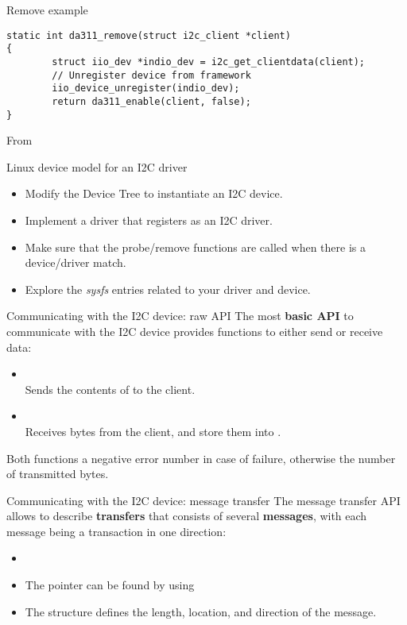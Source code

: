 \begin{frame}[fragile]{Remove example}
  \begin{block}{}
    \begin{verbatim}
static int da311_remove(struct i2c_client *client)
{
        struct iio_dev *indio_dev = i2c_get_clientdata(client);
        // Unregister device from framework
        iio_device_unregister(indio_dev);
        return da311_enable(client, false);
}
    \end{verbatim}
  \end{block}
  From 
\end{frame}

\setuplabframe
{Linux device model for an I2C driver}
{
  \begin{itemize}
  \item Modify the Device Tree to instantiate an I2C device.
  \item Implement a driver that registers as an I2C driver.
  \item Make sure that the probe/remove functions are called
        when there is a device/driver match.
  \item Explore the {\em sysfs} entries related to your driver and
    device.
  \end{itemize}
}

\begin{frame}{Communicating with the I2C device: raw API}
  The most {\bf basic API} to communicate with the I2C device provides
  functions to either send or receive data:
  \begin{itemize}
  \item
    \\Sends the contents of  to the client.
  \item
    \\Receives {} bytes from the client, and store them into
    .
  \end{itemize}
  Both functions a negative error number in case of failure, otherwise the
  number of transmitted bytes.
\end{frame}

\begin{frame}{Communicating with the I2C device: message transfer}
  The message transfer API allows to describe {\bf transfers} that
  consists of several {\bf messages}, with each message being a
  transaction in one direction:
  \begin{itemize}
  \item
  \item The  pointer can be found by using
  \item The  structure defines the length, location, and
    direction of the message.
  \end{itemize}
\end{frame}

